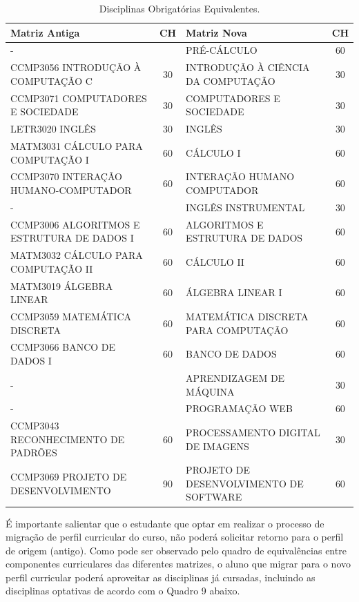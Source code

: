 \begin{center}
  
  \begin{tiny}
    \begin{longtable}{p{6.5cm}cp{6.5cm}c}
      \caption{\label{quadro:disciplinas-obrigatorias-equivalentes}Disciplinas Obrigatórias Equivalentes.}\\
    \toprule
    \textbf{Matriz Antiga} & \textbf{CH} & \textbf{Matriz Nova} & \textbf{CH}\\
    \midrule
    - & & PRÉ-CÁLCULO & 60 \\ \midrule
    CCMP3056 INTRODUÇÃO À COMPUTAÇÃO C & 30 & INTRODUÇÃO À CIÊNCIA DA COMPUTAÇÃO & 30 \\ \midrule
    CCMP3071 COMPUTADORES E SOCIEDADE  & 30 & COMPUTADORES E SOCIEDADE & 30 \\ \midrule
    LETR3020 INGLÊS & 30 & INGLÊS  & 30 \\ \midrule
    MATM3031 CÁLCULO PARA COMPUTAÇÃO I  & 60 & CÁLCULO I & 60 \\ \midrule
    CCMP3070 INTERAÇÃO HUMANO-COMPUTADOR  & 60 & INTERAÇÃO HUMANO COMPUTADOR & 60 \\ \midrule
    - & & INGLÊS INSTRUMENTAL & 30 \\ \midrule
    CCMP3006 ALGORITMOS E ESTRUTURA DE DADOS I  & 60 & ALGORITMOS E ESTRUTURA DE DADOS & 60 \\ \midrule
    MATM3032 CÁLCULO PARA COMPUTAÇÃO II  & 60 & CÁLCULO II & 60 \\ \midrule
    MATM3019 ÁLGEBRA LINEAR  & 60 & ÁLGEBRA LINEAR I & 60 \\ \midrule
    CCMP3059 MATEMÁTICA DISCRETA  & 60 & MATEMÁTICA DISCRETA PARA COMPUTAÇÃO & 60 \\ \midrule
    CCMP3066 BANCO DE DADOS I & 60 & BANCO DE DADOS & 60 \\ \midrule
    - & & APRENDIZAGEM DE MÁQUINA & 30 \\ \midrule
    - & & PROGRAMAÇÃO WEB & 60  \\ \midrule
    CCMP3043 RECONHECIMENTO DE PADRÕES  & 60 & PROCESSAMENTO DIGITAL DE IMAGENS & 30 \\ \midrule
    CCMP3069 PROJETO DE DESENVOLVIMENTO & 90 & PROJETO DE DESENVOLVIMENTO DE SOFTWARE & 60 \\
\bottomrule
\end{longtable}
\end{tiny}
\end{center}

É importante salientar que o estudante que optar em realizar o processo de migração de perfil curricular do curso, não poderá solicitar retorno para o perfil de origem (antigo). Como pode ser observado pelo quadro de equivalências entre componentes curriculares das diferentes matrizes, o aluno que migrar para o novo perfil curricular poderá aproveitar as disciplinas já cursadas, incluindo as disciplinas optativas de acordo com o Quadro 9 abaixo.

